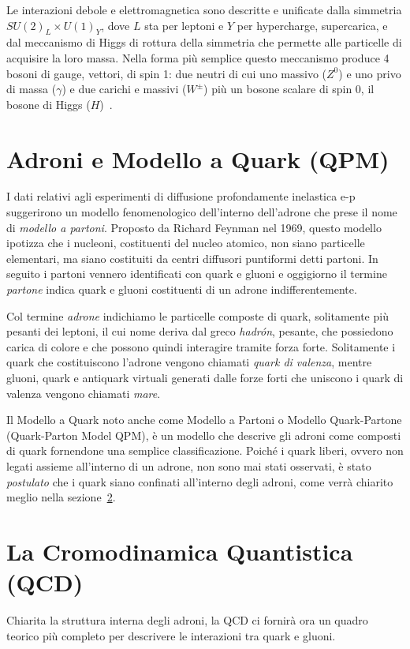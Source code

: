     Le interazioni debole e elettromagnetica sono descritte e unificate dalla simmetria $SU(2)_L \times U(1)_Y$, dove $L$ sta per leptoni e $Y$ per hypercharge, supercarica, e dal meccanismo di Higgs di rottura della simmetria che permette alle particelle di acquisire la loro massa. Nella forma più semplice questo meccanismo produce 4 bosoni di gauge, vettori, di spin 1: due neutri di cui uno massivo ($Z^0$) e uno privo di massa ($\gamma$) e due carichi e massivi ($W^\pm$) più un bosone scalare di spin 0, il bosone di Higgs ($H$)~\cite{Vitale_1995}.

    \newpage

\section{Adroni e Modello a Quark (QPM)}
\label{sec:QPM}
    I dati relativi agli esperimenti di diffusione profondamente inelastica e-p suggerirono un modello fenomenologico dell'interno dell'adrone che prese il nome di \textit{modello a partoni}. Proposto da Richard Feynman nel 1969, questo modello ipotizza che i nucleoni, costituenti del nucleo atomico, non siano particelle elementari, ma siano costituiti da centri diffusori puntiformi detti partoni. In seguito i partoni vennero identificati con quark e gluoni e oggigiorno il termine \textit{partone} indica quark e gluoni costituenti di un adrone indifferentemente.
    
    Col termine \textit{adrone} indichiamo le particelle composte di quark, solitamente più pesanti dei leptoni, il cui nome deriva dal greco \textit{hadrón}, pesante, che possiedono carica di colore e che possono quindi interagire tramite forza forte. Solitamente i quark che costituiscono l'adrone vengono chiamati \textit{quark di valenza}, mentre gluoni, quark e antiquark virtuali generati dalle forze forti che uniscono i quark di valenza vengono chiamati \textit{mare}.

    Il Modello a Quark noto anche come Modello a Partoni o Modello Quark-Partone (Quark-Parton Model QPM), è un modello che descrive gli adroni come composti di quark fornendone una semplice classificazione. Poiché i quark liberi, ovvero non legati assieme all'interno di un adrone, non sono mai stati osservati, è stato \textit{postulato} che i quark siano confinati all'interno degli adroni, come verrà chiarito meglio nella sezione~\ref{sec:QCD}.

\section{La Cromodinamica Quantistica (QCD)}
\label{sec:QCD}
    Chiarita la struttura interna degli adroni, la QCD ci fornirà ora un quadro teorico più completo per descrivere le interazioni tra quark e gluoni.

